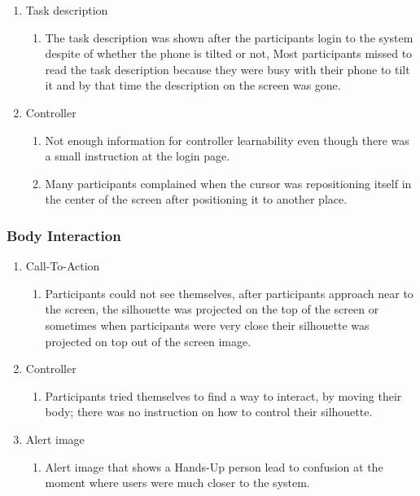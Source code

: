\begin{enumerate}
\item	Task description
\begin{enumerate}
\item	The task description was shown after the participants login to the system despite of whether the phone is tilted or not, Most participants missed to read the task description because they were busy with their phone to tilt it and by that time the description on the screen was gone.
\end{enumerate}

\item	Controller
\begin{enumerate}
\item	Not enough information for controller learnability even though there was a small instruction at the login page.
\item	Many participants complained when the cursor was repositioning itself in the center of the screen after positioning it to another place.
\end{enumerate}
\end{enumerate}

\subsubsection {Body Interaction}

\begin{enumerate}
\item	Call-To-Action
\begin{enumerate}
\item	Participants could not see themselves, after participants approach near to the screen, the silhouette was projected on the top of the screen or sometimes when participants were very close their silhouette was projected on top out of the screen image.
\end{enumerate}

\item	Controller
\begin{enumerate}
\item	Participants tried themselves to find a way to interact, by moving their body; there was no instruction on how to control their silhouette.
\end{enumerate}

\item	Alert image
\begin{enumerate}
\item	Alert image that shows a Hands-Up person lead to confusion at the moment where users were much closer to the system.
\end{enumerate}
\end{enumerate}

